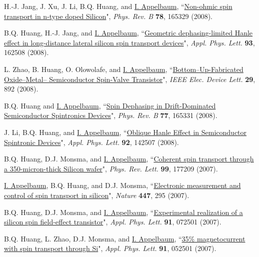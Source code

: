 \documentclass[paper=letter,fontsize=11pt]{scrartcl} %
\newcommand{\PaperEntry}[7]{
		\noindent #1, ``\href{#7}{#2}", \textit{#3} \textbf{#4}, #5 (#6).}
\begin{document}
\begin{etaremune}
\item\PaperEntry{H.-J. Jang, J. Xu, J. Li, B.Q. Huang, and \underline{I. Appelbaum}}{Non-ohmic spin transport in n-type doped Silicon}{Phys. Rev. B}{78}{165329}{2008}{http://dx.doi.org/10.1103/PhysRevB.78.165329}

\item\PaperEntry{B.Q. Huang, H.-J. Jang, and \underline{I. Appelbaum}}{Geometric dephasing-limited Hanle effect in long-distance lateral silicon spin transport devices}{Appl. Phys. Lett.}{93}{162508}{2008}{http://dx.doi.org/10.1063/1.3006333}

\item\PaperEntry{L. Zhao, B. Huang, O. Olowolafe, and \underline{I. Appelbaum}}{Bottom–Up-Fabricated Oxide–Metal– Semiconductor Spin-Valve Transistor}{IEEE Elec. Device Lett.}{29}{892}{2008}{http://dx.doi.org/10.1109/LED.2008.2001177}


\item\PaperEntry{B.Q. Huang and \underline{I. Appelbaum}}{Spin Dephasing in Drift-Dominated Semiconductor Spintronics Devices}{Phys. Rev. B}{77}{165331}{2008}{http://dx.doi.org/10.1103/PhysRevB.77.165331}

\item\PaperEntry{J. Li, B.Q. Huang, and \underline{I. Appelbaum}}{Oblique Hanle Effect in Semiconductor Spintronic Devices}{Appl. Phys. Lett.}{92}{142507}{2008}{http://dx.doi.org/10.1063/1.2907497}

\item\PaperEntry{B.Q. Huang, D.J. Monsma, and \underline{I. Appelbaum}}{Coherent spin transport through a 350-micron-thick Silicon wafer}{Phys. Rev. Lett.}{99}{177209}{2007}{http://dx.doi.org/10.1103/PhysRevLett.99.177209}

\item\PaperEntry{\underline{I. Appelbaum}, B.Q. Huang, and D.J. Monsma}{Electronic measurement and control of spin transport in silicon}{Nature}{447}{295}{2007}{http://dx.doi.org/10.1038/nature05803}

\item\PaperEntry{B.Q. Huang, D.J. Monsma, and \underline{I. Appelbaum}}{Experimental realization of a silicon spin field-effect transistor}{Appl. Phys. Lett.}{91}{072501}{2007}{http://dx.doi.org/10.1063/1.2770656}

\item\PaperEntry{B.Q. Huang, L. Zhao, D.J. Monsma, and \underline{I. Appelbaum}}{35\% magnetocurrent with spin transport through Si}{Appl. Phys. Lett.}{91}{052501}{2007}{http://dx.doi.org/10.1063/1.2767198}


\end{etaremune}
\end{document}
